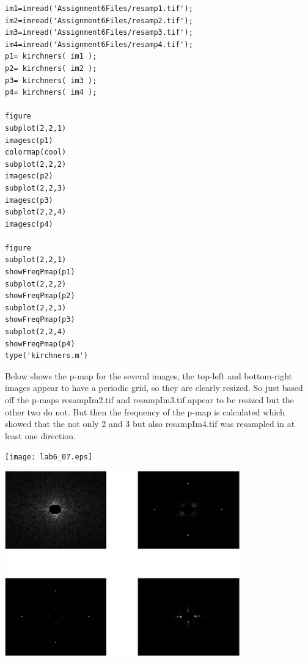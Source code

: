 \documentclass{article}
\begin{document}
\begin{verbatim}
im1=imread('Assignment6Files/resamp1.tif');
im2=imread('Assignment6Files/resamp2.tif');
im3=imread('Assignment6Files/resamp3.tif');
im4=imread('Assignment6Files/resamp4.tif');
p1= kirchners( im1 );
p2= kirchners( im2 );
p3= kirchners( im3 );
p4= kirchners( im4 );

figure
subplot(2,2,1)
imagesc(p1)
colormap(cool)
subplot(2,2,2)
imagesc(p2)
subplot(2,2,3)
imagesc(p3)
subplot(2,2,4)
imagesc(p4)

figure
subplot(2,2,1)
showFreqPmap(p1)
subplot(2,2,2)
showFreqPmap(p2)
subplot(2,2,3)
showFreqPmap(p3)
subplot(2,2,4)
showFreqPmap(p4)
type('kirchners.m')
\end{verbatim}\color{black}
    

Below shows the p-map for the several images, the top-left and bottom-right
images appear to have a periodic grid, so they are clearly resized. So just
based off the p-maps resampIm2.tif and resampIm3.tif appear to be resized
but the other two do not. But then the frequency of the p-map is calculated
which showed that the not only 2 and 3 but also resampIm4.tif was resampled
in at least one direction. 


\texttt{[image: lab6\_07.eps]}

\includegraphics [width=4in]{lab6_08.eps}
\end{document}
